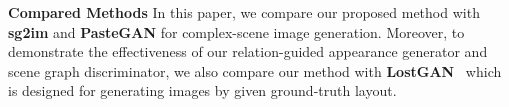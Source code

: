 \noindent\textbf{Compared Methods} In this paper, we compare our proposed method with \textbf{sg2im} and \textbf{PasteGAN} for complex-scene image generation. Moreover, to demonstrate the effectiveness of our relation-guided appearance generator and scene graph discriminator, we also compare our method with \textbf{LostGAN}~\cite{sun2019image} which is designed for generating images by given ground-truth layout.


